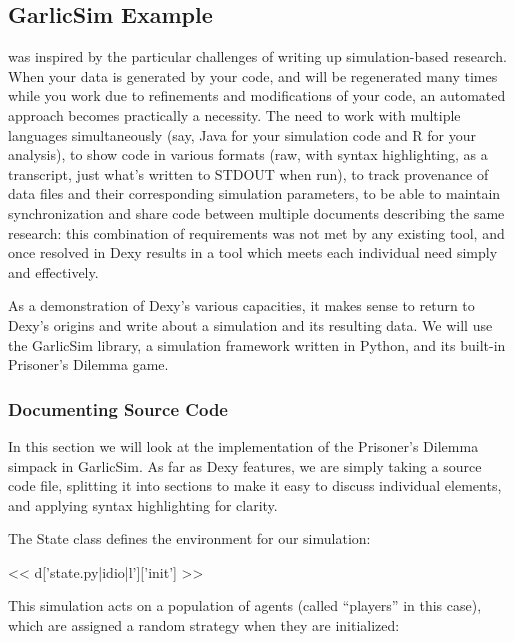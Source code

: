 \documentclass[custom, plainsections]{sciposter}
\begin{document}
\begin{multicols*}{2}
\small

\subsection*{GarlicSim Example}

 was inspired by the particular challenges of writing up simulation-based research. When your data is generated by your code, and will be regenerated many times while you work due to refinements and modifications of your code, an automated approach becomes practically a necessity. The need to work with multiple languages simultaneously (say, Java for your simulation code and R for your analysis), to show code in various formats (raw, with syntax highlighting, as a transcript, just what's written to STDOUT when run), to track provenance of data files and their corresponding simulation parameters, to be able to maintain synchronization and share code between multiple documents describing the same research: this combination of requirements was not met by any existing tool, and once resolved in Dexy results in a tool which meets each individual need simply and effectively.

As a demonstration of Dexy's various capacities, it makes sense to return to Dexy's origins and write about a simulation and its resulting data. We will use the GarlicSim library, a simulation framework written in Python, and its built-in Prisoner's Dilemma game.

\subsubsection*{Documenting Source Code}

In this section we will look at the implementation of the Prisoner's Dilemma simpack in GarlicSim. As far as Dexy features, we are simply taking a source code file, splitting it into sections to make it easy to discuss individual elements, and applying syntax highlighting for clarity.

\vspace{0.5cm}

The State class defines the environment for our simulation:


\tiny
<< d['state.py|idio|l']['init'] >>
\small

This simulation acts on a population of agents (called ``players'' in this case), which are assigned a random strategy when they are initialized:


\end{multicols*}
\end{document}
